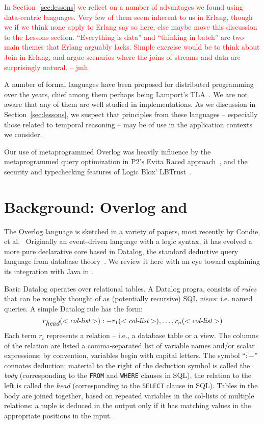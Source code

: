 \documentclass{sig-alternate}
\newcommand{\jmh}[1]{{\textcolor{red}{#1 -- jmh}}}
\begin{document}
\jmh{In Section~\ref{sec:lessons} we reflect on a number of advantages we found using data-centric languages. Very few of them seem inherent to us in Erlang, though we 
if we think none apply to Erlang say so here, else maybe move this discussion to the Lessons section.  ``Everything is data'' and ``thinking in batch'' are two main themes that Erlang arguably lacks.  Simple exercise would be to think about Join in Erlang, and argue scenarios where the joins of streams and data are surprisingly natural.}

A number of formal languages have been proposed for distributed programming over the years, chief among them perhaps being Lamport's TLA~\cite{TLA}.  We are not aware that any of them are well studied in implementations. As we discussion in Section~\ref{sec:lessons}, we suspect that principles from these languages -- especially those related to temporal reasoning -- may be of use in the application contexts we consider.

Our use of metaprogrammed Overlog was heavily influence by the metaprogrammed query optimization in P2's Evita Raced approach~\cite{evitaraced}, and the security and typechecking features of Logic Blox' LBTrust~\cite{lbtrust}.


\section{Background: Overlog and \JOL}
The Overlog language is sketched in a variety of papers, most recently by Condie, et al.~\cite{evitaraced}  Originally an event-driven language with a logic syntax, it has evolved a more pure declarative core based in Datalog, the standard deductive query language from database theory~\cite{ullmanbook}.  We review it here with an eye toward explaining its integration with Java in \JOL.  

Basic Datalog operates over relational tables. A Datalog progra, consists of {\em rules} that can be roughly thought of as (potentially recursive) SQL {\em views}: i.e. named queries.  A simple Datalog rule has the form:
\[
	r_{\mbox{\em head}}(<\mbox{\em col-list}>) :- r_1(<\mbox{\em col-list}>), \ldots, r_n(<\mbox{\em col-list}>)
\]
Each term $r_i$ represents a relation -- i.e., a database table or a view.  The columns of the relation are listed a comma-separated list of variable names and/or scalar expressions; by convention, variables begin with capital letters.  The symbol ``$:-$'' connotes deduction; material to the right of the deduction symbol is called the {\em body} (corresponding to the {\tt FROM} and {\tt WHERE} clauses in SQL), the relation to the left is called the {\em head} (corresponding to the {\tt SELECT} clause in SQL).  Tables in the body are joined together, based on repeated variables in the col-lists of multiple relations: a tuple is deduced in the output only if it has matching values in the appropriate positions in the input.
\end{document}
